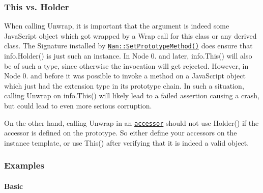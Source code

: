 \subsubsection*{This vs. Holder}

When calling {\ttfamily Unwrap}, it is important that the argument is indeed some Java\+Script object which got wrapped by a {\ttfamily Wrap} call for this class or any derived class. The {\ttfamily Signature} installed by \href{methods.md#api_nan_set_prototype_method}{\tt {\ttfamily Nan\+::\+Set\+Prototype\+Method()}} does ensure that {\ttfamily info.\+Holder()} is just such an instance. In Node 0. and later, {\ttfamily info.\+This()} will also be of such a type, since otherwise the invocation will get rejected. However, in Node 0. and before it was possible to invoke a method on a Java\+Script object which just had the extension type in its prototype chain. In such a situation, calling {\ttfamily Unwrap} on {\ttfamily info.\+This()} will likely lead to a failed assertion causing a crash, but could lead to even more serious corruption.

On the other hand, calling {\ttfamily Unwrap} in an \href{methods.md#api_nan_set_accessor}{\tt accessor} should not use {\ttfamily Holder()} if the accessor is defined on the prototype. So either define your accessors on the instance template, or use {\ttfamily This()} after verifying that it is indeed a valid object.

\subsubsection*{Examples}

\paragraph*{Basic}


